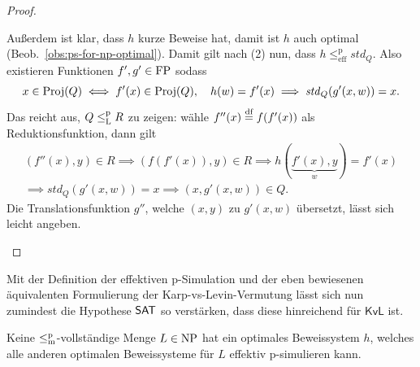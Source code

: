 \begin{proof}
\begin{prooflist}[label={}]
    Außerdem ist klar, dass $h$ kurze Beweise hat, damit ist $h$ auch optimal (Beob.~\ref{obs:ps-for-np-optimal}). %
    Damit gilt nach (2) nun, dass $h\leq^\mathrm p_\mathrm{eff} \mathit{std}_Q$. Also existieren Funktionen $f',g'\in\mathrm{FP}$ sodass
    \[ x\in \operatorname{Proj}(Q)\iff f'(x)\in\operatorname{Proj}(Q),\quad h(w)=f'(x) \implies \mathit{std}_Q(g'(x,w))=x. \]%
    Das reicht aus, $Q\leq_\mathrm{L}^\mathrm{p} R$ zu zeigen: wähle $f''(x)\stackrel{\text{df}}{=} f(f'(x))$ als Reduktionsfunktion, dann gilt
    \begin{gather*}
        (f''(x), y)\in R \implies (f(f'(x)), y)\in R \implies h(\underbrace{f'(x),y}_{w})=f'(x) \\
    \implies \mathit{std}_Q(g'(x,w))=x \implies (x,g'(x,w))\in Q. \end{gather*}
    Die Translationsfunktion $g''$, welche $(x,y)$ zu $g'(x,w)$ übersetzt, lässt sich leicht angeben.
\end{prooflist}
\end{proof}

Mit der Definition der effektiven p-Simulation und der eben bewiesenen äquivalenten Formulierung der Karp-vs-Levin-Vermutung lässt sich nun zumindest die Hypothese $\mathsf{SAT}$ so verstärken, dass diese hinreichend für $\mathsf{KvL}$ ist.


\begin{conjecture}
    Keine $\leq_\mathrm{m}^\mathrm{p}$-vollständige Menge $L\in\mathrm{NP}$ hat ein optimales Beweissystem $h$, welches alle anderen optimalen Beweissysteme für $L$ effektiv p-simulieren kann. 
\end{conjecture}

